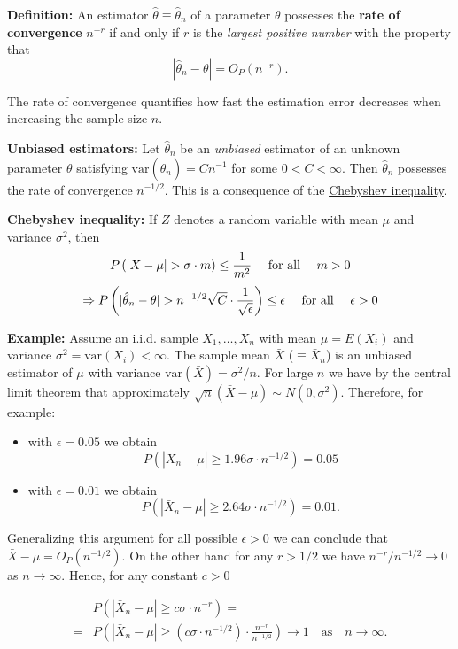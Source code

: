 \documentclass[]{book}
\providecommand{\tightlist}{%
  \setlength{\itemsep}{0pt}\setlength{\parskip}{0pt}}
\theoremstyle{definition}
\theoremstyle{definition}
\theoremstyle{definition}
\theoremstyle{remark}
\begin{document}
\textbf{Definition:} An estimator \(\hat\theta\equiv\hat\theta_n\) of a parameter \(\theta\) possesses the
\textbf{rate of convergence} \(n^{-r}\) if and only if \(r\) is the \emph{largest positive number} with the property that
\[|\hat\theta_n-\theta|=O_P(n^{-r}).\]

The rate of convergence quantifies how fast the estimation error decreases when increasing the sample size \(n\).

\textbf{Unbiased estimators:} Let \(\hat\theta_n\) be an \emph{unbiased} estimator of an unknown parameter \(\theta\) satisfying \(\textrm{var}(\hat\theta_n)=C n^{-1}\) for some \(0<C<\infty\). Then \(\hat\theta_n\) possesses the rate of convergence \(n^{-1/2}\). This is a consequence of the \href{https://www.statlect.com/fundamentals-of-probability/Chebyshev-inequality}{Chebyshev inequality}.

\textbf{Chebyshev inequality:} If \(Z\) denotes a random variable with mean \(\mu\) and variance \(\sigma^2\), then
\[P\left(|X-\mu|> \sigma \cdot m\right)\le \frac{1}{m^2}\quad\hbox{ for all }\quad m>0\]
\[\Rightarrow
P\left(|\hat\theta_n-\theta|> n^{-1/2}\sqrt{C} \cdot
\frac{1}{\sqrt{\epsilon}}\right)\leq \epsilon \quad\hbox{ for all }\quad\epsilon>0\]

\textbf{Example:} Assume an i.i.d. sample \(X_1,\dots,X_n\) with mean \(\mu=E(X_i)\) and variance \(\sigma^2=\textrm{var}(X_i)<\infty\). The sample mean \(\bar X\) (\(\equiv \bar X_n\)) is an unbiased estimator of \(\mu\) with variance \(\textrm{var}(\bar X)=\sigma^2/n\).
For large \(n\) we have by the central limit theorem that approximately \(\sqrt{n}(\bar X-\mu)\sim N(0,\sigma^2)\). Therefore, for example:

\begin{itemize}
\tightlist
\item
  with \(\epsilon=0.05\) we obtain
  \[P\left(|\bar X_n-\mu|\ge 1.96\sigma\cdot n^{-1/2}\right)=0.05\]
\item
  with \(\epsilon=0.01\) we obtain
  \[P\left(|\bar X_n-\mu|\ge 2.64\sigma\cdot n^{-1/2}\right)=0.01.\]
\end{itemize}

Generalizing this argument for all possible \(\epsilon>0\) we can conclude that
\(\bar X-\mu=O_P(n^{-1/2})\). On the other hand for any \(r>1/2\) we have \(n^{-r}/n^{-1/2}\rightarrow 0\) as \(n\rightarrow \infty\). Hence, for any constant \(c>0\)

\begin{align*}
 &P\left(|\bar X_n-\mu|\geq c\sigma\cdot n^{-r}\right)=\\
=&P\left(|\bar X_n-\mu|\ge (c\sigma\cdot n^{-1/2})\cdot\frac{n^{-r}}{n^{-1/2}}\right)\rightarrow 1 \quad\text{as}\quad n\rightarrow \infty.
\end{align*}
\end{document}
